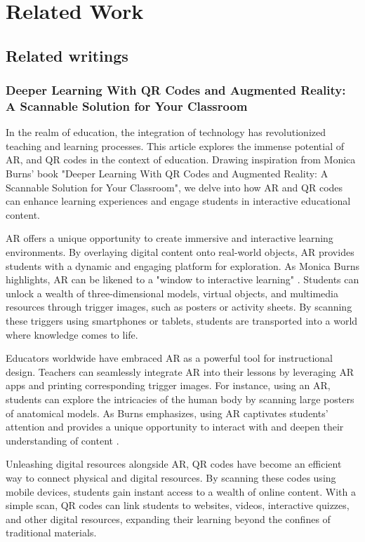 \chapter{Related Work}\label{cap:relatedwork}
\section{Related writings}
\subsection*{Deeper Learning With QR Codes and Augmented Reality: A Scannable Solution for Your Classroom}

In the realm of education, the integration of technology has revolutionized teaching and learning processes. This article explores the immense potential of \ac{AR}, and \ac{QR} codes in the context of education. Drawing inspiration from Monica Burns' book "Deeper Learning With QR Codes and Augmented Reality: A Scannable Solution for Your Classroom", we delve into how \ac{AR} and \ac{QR} codes can enhance learning experiences and engage students in interactive educational content.

\ac{AR} offers a unique opportunity to create immersive and interactive learning environments. By overlaying digital content onto real-world objects, \ac{AR} provides students with a dynamic and engaging platform for exploration. As Monica Burns highlights, \ac{AR} can be likened to a "window to interactive learning" \cite{Burns2016}. Students can unlock a wealth of three-dimensional models, virtual objects, and multimedia resources through trigger images, such as posters or activity sheets. By scanning these triggers using smartphones or tablets, students are transported into a world where knowledge comes to life.

Educators worldwide have embraced \ac{AR} as a powerful tool for instructional design. Teachers can seamlessly integrate \ac{AR} into their lessons by leveraging \ac{AR} apps and printing corresponding trigger images. For instance, using an \acf{AR}, students can explore the intricacies of the human body by scanning large posters of anatomical models. As Burns emphasizes, using \ac{AR} captivates students' attention and provides a unique opportunity to interact with and deepen their understanding of content \cite{Burns2016}.

Unleashing digital resources alongside \ac{AR}, \ac{QR} codes have become an efficient way to connect physical and digital resources. By scanning these codes using mobile devices, students gain instant access to a wealth of online content. With a simple scan, \ac{QR} codes can link students to websites, videos, interactive quizzes, and other digital resources, expanding their learning beyond the confines of traditional materials.


